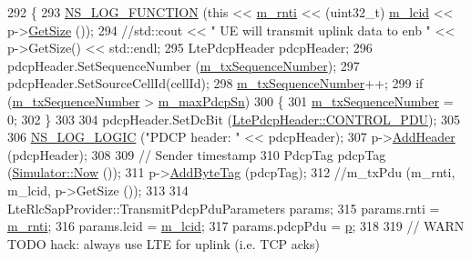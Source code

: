 \begin{DoxyCode}
292                                                                    \{
293          \hyperlink{log-macros-disabled_8h_a90b90d5bad1f39cb1b64923ea94c0761}{NS\_LOG\_FUNCTION} (\textcolor{keyword}{this} << \hyperlink{classns3_1_1McUePdcp_a5807c425f6989fee6982fc11fdb5e9a9}{m\_rnti} << (uint32\_t) 
      \hyperlink{classns3_1_1McUePdcp_ad68b36aee03df89a1d476f78c0db4bbc}{m\_lcid} << p->\hyperlink{classns3_1_1Packet_a462855c9929954d4301a4edfe55f4f1c}{GetSize} ());
294           \textcolor{comment}{//std::cout << " UE will transmit uplink data to enb " << p->GetSize() << std::endl;}
295           LtePdcpHeader pdcpHeader;
296           pdcpHeader.SetSequenceNumber (\hyperlink{classns3_1_1McUePdcp_a40f14de1c02f288a87aa5f70501cf31e}{m\_txSequenceNumber});
297           pdcpHeader.SetSourceCellId(cellId);
298           \hyperlink{classns3_1_1McUePdcp_a40f14de1c02f288a87aa5f70501cf31e}{m\_txSequenceNumber}++;
299           \textcolor{keywordflow}{if} (\hyperlink{classns3_1_1McUePdcp_a40f14de1c02f288a87aa5f70501cf31e}{m\_txSequenceNumber} > \hyperlink{classns3_1_1McUePdcp_ab397f1cb87dfd3d4362f6d58adf968bc}{m\_maxPdcpSn})
300             \{
301               \hyperlink{classns3_1_1McUePdcp_a40f14de1c02f288a87aa5f70501cf31e}{m\_txSequenceNumber} = 0;
302             \}
303 
304           pdcpHeader.SetDcBit (\hyperlink{classns3_1_1LtePdcpHeader_a3a965023a8f37aad003904c3d64d7ffda2e4b039fbca01a845596f2baaec3d79d}{LtePdcpHeader::CONTROL\_PDU});
305 
306           \hyperlink{group__logging_ga88acd260151caf2db9c0fc84997f45ce}{NS\_LOG\_LOGIC} (\textcolor{stringliteral}{"PDCP header: "} << pdcpHeader);
307           p->\hyperlink{classns3_1_1Packet_a465108c595a0bc592095cbcab1832ed8}{AddHeader} (pdcpHeader);
308 
309           \textcolor{comment}{// Sender timestamp}
310           PdcpTag pdcpTag (\hyperlink{classns3_1_1Simulator_ac3178fa975b419f7875e7105be122800}{Simulator::Now} ());
311           p->\hyperlink{classns3_1_1Packet_ad5997caea8c22757acade2fcb4d7daca}{AddByteTag} (pdcpTag);
312           \textcolor{comment}{//m\_txPdu (m\_rnti, m\_lcid, p->GetSize ());}
313 
314           LteRlcSapProvider::TransmitPdcpPduParameters params;
315           params.rnti = \hyperlink{classns3_1_1McUePdcp_a5807c425f6989fee6982fc11fdb5e9a9}{m\_rnti};
316           params.lcid = \hyperlink{classns3_1_1McUePdcp_ad68b36aee03df89a1d476f78c0db4bbc}{m\_lcid};
317           params.pdcpPdu = \hyperlink{lte__link__budget_8m_ac9de518908a968428863f829398a4e62}{p};
318 
319           \textcolor{comment}{// WARN TODO hack: always use LTE for uplink (i.e. TCP acks)}

\end{DoxyCode}
